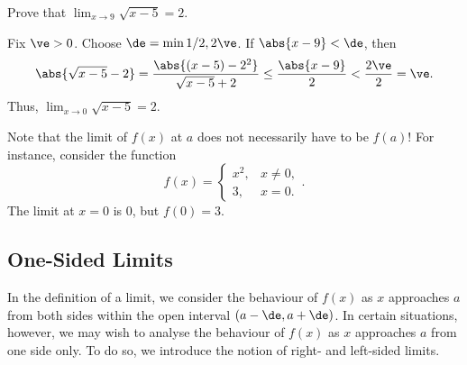 \begin{figure}[H]
\centering
{}
\caption{}
\end{figure}

\begin{sample}
    Prove that $\lim_{x \to 9} \sqrt{x-5} = 2$.
\end{sample}
\begin{sampans}
    Fix $\ve > 0$. Choose $\de = \min{1/2, 2\ve}$. If $\abs{x - 9} < \de$, then \[\abs{\sqrt{x-5} - 2} = \frac{\abs{(x - 5) - 2^2}}{\sqrt{x-5} + 2} \leq \frac{\abs{x-9}}{2} < \frac{2\ve}{2} = \ve.\] Thus, $\lim_{x \to 0} \sqrt{x-5} = 2$.
\end{sampans}

Note that the limit of $f(x)$ at $a$ does not necessarily have to be $f(a)$! For instance, consider the function \[f(x) = \begin{cases}x^2, & x \neq 0, \\ 3, & x = 0.\end{cases}.\] The limit at $x = 0$ is 0, but $f(0) = 3$.

\subsection{One-Sided Limits}

In the definition of a limit, we consider the behaviour of $f(x)$ as $x$ approaches $a$ from both sides within the open interval $(a-\de, a+\de)$. In certain situations, however, we may wish to analyse the behaviour of $f(x)$ as $x$ approaches $a$ from one side only. To do so, we introduce the notion of right- and left-sided limits.

